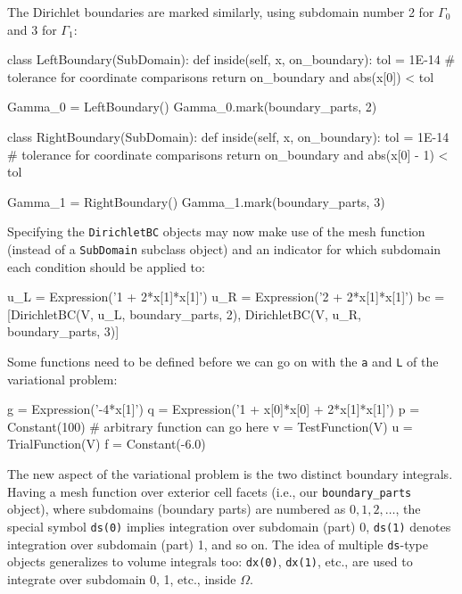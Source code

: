 The Dirichlet boundaries are marked similarly, using subdomain number 2 for $\Gamma_0$ and 3 for $\Gamma_1$:
\begin{python}
class LeftBoundary(SubDomain):
    def inside(self, x, on_boundary):
        tol = 1E-14   # tolerance for coordinate comparisons
        return on_boundary and abs(x[0]) < tol

Gamma_0 = LeftBoundary()
Gamma_0.mark(boundary_parts, 2)

class RightBoundary(SubDomain):
    def inside(self, x, on_boundary):
        tol = 1E-14   # tolerance for coordinate comparisons
        return on_boundary and abs(x[0] - 1) < tol

Gamma_1 = RightBoundary()
Gamma_1.mark(boundary_parts, 3)
\end{python}
Specifying the {\fontsize{10pt}{10pt}\texttt{DirichletBC}} objects may now make use of
the mesh function (instead of a {\fontsize{10pt}{10pt}\texttt{SubDomain}} subclass object) 
and an indicator for which subdomain each condition
should be applied to:
\begin{python}
u_L = Expression('1 + 2*x[1]*x[1]')
u_R = Expression('2 + 2*x[1]*x[1]')
bc = [DirichletBC(V, u_L, boundary_parts, 2),
      DirichletBC(V, u_R, boundary_parts, 3)]
\end{python}

Some functions need to be defined before we can go on with the
{\fontsize{10pt}{10pt}\texttt{a}} and {\fontsize{10pt}{10pt}\texttt{L}} of the variational problem:
\begin{python}
g = Expression('-4*x[1]')
q = Expression('1 + x[0]*x[0] + 2*x[1]*x[1]')
p = Constant(100)  # arbitrary function can go here
v = TestFunction(V)
u = TrialFunction(V)
f = Constant(-6.0)
\end{python}

The new aspect of the variational problem is the two distinct
boundary integrals.
Having a mesh function over exterior cell facets (i.e., our
{\fontsize{10pt}{10pt}\verb!boundary_parts!} object), where subdomains (boundary parts) are
numbered as $0,1,2,\ldots$, the special symbol {\fontsize{10pt}{10pt}\texttt{ds(0)}}
implies integration over subdomain (part) 0, {\fontsize{10pt}{10pt}\texttt{ds(1)}} denotes
integration over subdomain (part) 1, and so on.
The idea of multiple {\fontsize{10pt}{10pt}\texttt{ds}}-type objects generalizes to volume
integrals too: {\fontsize{10pt}{10pt}\texttt{dx(0)}}, {\fontsize{10pt}{10pt}\texttt{dx(1)}}, etc., are used to
integrate over subdomain 0, 1, etc.,  inside $\Omega$.

